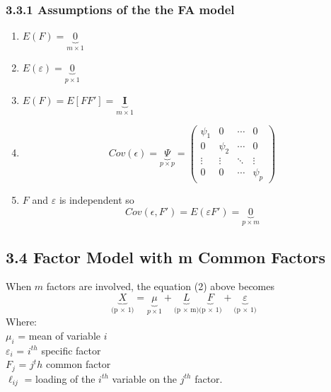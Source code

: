 \documentclass[12pt]{article}
\begin{document}
\subsubsection*{3.3.1 Assumptions of the the FA model}
\begin{enumerate}[label=\roman*]
	\item $E(F) = \underbrace{0}_{m \times 1}$
	\item $E(\varepsilon) = \underbrace{0}_{p \times 1}$
	\item $E(F)= E[FF']=\underbrace{\textbf{I}}_{m \times 1}$
	\item 
	\begin{equation}
		Cov(\epsilon)= \underbrace{\Psi}_{p \times p}  = \begin{pmatrix}
			\psi_{1} & 0 & \cdots & 0 \\
			0 & \psi_{2} & \cdots & 0 \\
			\vdots & \vdots & \ddots & \vdots \\
			0 & 0 & \cdots & \psi_{p}
		\end{pmatrix}
	\end{equation}
	\item $F$ and $\varepsilon$ is independent so $$Cov(\epsilon, F')=E(\varepsilon F') = \underbrace{0}_{p \times m}$$
\end{enumerate}

\subsection* {3.4  Factor Model with m Common Factors}
When $m$ factors are involved, the equation (2) above becomes
\begin{equation}
	\underbrace{X}_\text{(p $\times$ 1)}=\underbrace{\mu}_{p \times 1}
	+\underbrace{L}_\text{(p $\times$ m)} \underbrace{F}_\text{(p $\times$ 1)} + \underbrace{\varepsilon}_\text{(p $\times$ 1)}
\end{equation}
\noindent Where:\\
$\mu_i$ = mean of variable $i$ \\
$\varepsilon_i$ = $i^{th}$ specific factor \\
$F_j$ = $j^th$ common factor\\
$\ell_{ij}$ = loading of the $i^{th}$ variable on the $j^{th}$ factor.\\
\end{document}
